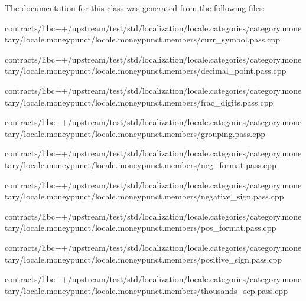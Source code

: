 The documentation for this class was generated from the following files\+:\begin{DoxyCompactItemize}
\item 
contracts/libc++/upstream/test/std/localization/locale.\+categories/category.\+monetary/locale.\+moneypunct/locale.\+moneypunct.\+members/curr\+\_\+symbol.\+pass.\+cpp\item 
contracts/libc++/upstream/test/std/localization/locale.\+categories/category.\+monetary/locale.\+moneypunct/locale.\+moneypunct.\+members/decimal\+\_\+point.\+pass.\+cpp\item 
contracts/libc++/upstream/test/std/localization/locale.\+categories/category.\+monetary/locale.\+moneypunct/locale.\+moneypunct.\+members/frac\+\_\+digits.\+pass.\+cpp\item 
contracts/libc++/upstream/test/std/localization/locale.\+categories/category.\+monetary/locale.\+moneypunct/locale.\+moneypunct.\+members/grouping.\+pass.\+cpp\item 
contracts/libc++/upstream/test/std/localization/locale.\+categories/category.\+monetary/locale.\+moneypunct/locale.\+moneypunct.\+members/neg\+\_\+format.\+pass.\+cpp\item 
contracts/libc++/upstream/test/std/localization/locale.\+categories/category.\+monetary/locale.\+moneypunct/locale.\+moneypunct.\+members/negative\+\_\+sign.\+pass.\+cpp\item 
contracts/libc++/upstream/test/std/localization/locale.\+categories/category.\+monetary/locale.\+moneypunct/locale.\+moneypunct.\+members/pos\+\_\+format.\+pass.\+cpp\item 
contracts/libc++/upstream/test/std/localization/locale.\+categories/category.\+monetary/locale.\+moneypunct/locale.\+moneypunct.\+members/positive\+\_\+sign.\+pass.\+cpp\item 
contracts/libc++/upstream/test/std/localization/locale.\+categories/category.\+monetary/locale.\+moneypunct/locale.\+moneypunct.\+members/thousands\+\_\+sep.\+pass.\+cpp\end{DoxyCompactItemize}
